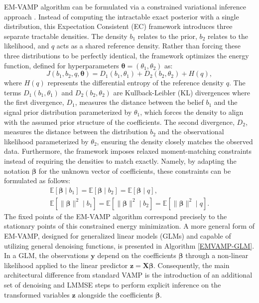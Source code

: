 EM-VAMP algorithm can be formulated via a constrained variational inference approach \cite{LearningFreeEnergies2018}. Instead of computing the intractable exact posterior with a single distribution, this Expectation Consistent (EC) framework introduces three separate tractable densities. The density $b_1$ relates to the prior, $b_2$ relates to the likelihood, and $q$ acts as a shared reference density. Rather than forcing these three distributions to be perfectly identical, the framework optimizes the energy function, defined for hyperparameters $\bm{\theta} = (\theta_1, \theta_2)$ as:
\begin{equation}
    J(b_1, b_2, q, \bm{\theta}) = D_1(b_1, \theta_1) + D_2(b_2, \theta_2) + H(q),
\end{equation}
where $H(q)$ represents the differential entropy of the reference density $q$. The terms $D_1(b_1, \theta_1)$ and $D_2(b_2, \theta_2)$ are Kullback-Leibler (KL) divergences where the first divergence, $D_1$, measures the distance between the belief $b_1$ and the signal prior distribution parameterized by $\theta_1$, which forces the density to align with the assumed prior structure of the coefficients. The second divergence, $D_2$, measures the distance between the distribution $b_2$ and the observational likelihood parameterized by $\theta_2$, ensuring the density closely matches the observed data. Furthermore, the framework imposes relaxed moment-matching constraints instead of requiring the densities to match exactly. Namely, by adapting the notation $\bm{\beta}$ for the unknown vector of coefficients, these constraints can be formulated as follows:
\begin{equation}
\begin{gathered}
\mathbb{E}[\bm{\beta} \mid b_1] = \mathbb{E}[\bm{\beta} \mid b_2] = \mathbb{E}[\bm{\beta} \mid q], \\ 
\mathbb{E}[\lVert \bm{\beta} \rVert^2 \mid b_1] = \mathbb{E}[\lVert \bm{\beta} \rVert^2 \mid b_2] = \mathbb{E}[\lVert \bm{\beta} \rVert^2 \mid q].
\end{gathered}
\end{equation}
The fixed points of the EM-VAMP algorithm correspond precisely to the stationary points of this constrained energy minimization. A more general form of EM-VAMP, designed for generalized linear models (GLMs) and capable of utilizing general denoising functions, is presented in Algorithm \ref{EMVAMP-GLM}. In a GLM, the observations $\bm{y}$ depend on the coefficients $\bm{\beta}$ through a non-linear likelihood applied to the linear predictor $\bm{z} = \bm{X} \bm{\beta}$. Consequently, the main architectural difference from standard VAMP is the introduction of an additional set of denoising and LMMSE steps to perform explicit inference on the transformed variables $\bm{z}$ alongside the coefficients $\bm{\beta}$.

